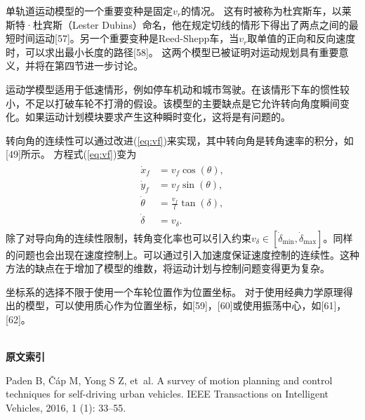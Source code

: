 单轨道运动模型的一个重要变种是固定$v_r$的情况。 这有时被称为杜宾斯车，以莱斯特·杜宾斯（Lester Dubins）命名，他在规定切线的情形下得出了两点之间的最短时间运动[57]。另一个重要变种是Reed-Shepp车，当$v_r$取单值的正向和反向速度时，可以求出最小长度的路径[58]。 这两个模型已被证明对运动规划具有重要意义，并将在第四节进一步讨论。

运动学模型适用于低速情形，例如停车机动和城市驾驶。在该情形下车的惯性较小，不足以打破车轮不打滑的假设。该模型的主要缺点是它允许转向角度瞬间变化。如果运动计划模块要求产生这种瞬时变化，这将是有问题的。

转向角的连续性可以通过改进(\ref{eq:vf})来实现，其中转向角是转角速率的积分，如[49]所示。 方程式(\ref{eq:vf})变为
\begin{align}
\begin{split}
\dot{x}_f&= v_f\cos(\theta),\\
\dot{y}_f&= v_f\sin(\theta),\\
\dot{\theta}&=\frac{v_f}{l}\tan(\delta),\\
\dot{\delta}&=v_{\delta}.
\end{split}
\end{align}
除了对导向角的连续性限制，转角变化率也可以引入约束$v_{\delta}\in [\dot{\delta}_{\min},\dot{\delta}_{\max}]$。同样的问题也会出现在速度控制上。可以通过引入加速度保证速度控制的连续性。这种方法的缺点在于增加了模型的维数，将运动计划与控制问题变得更为复杂。

坐标系的选择不限于使用一个车轮位置作为位置坐标。 对于使用经典力学原理得出的模型，可以使用质心作为位置坐标，如[59]，[60]或使用振荡中心，如[61]，[62]。\\\\
\begin{center}
\textbf{原文索引}
\end{center}

\begin{translationbib}
\item Paden B, {\v{C}}{\'a}p M, Yong S Z, et~al.
\newblock A survey of motion planning and control techniques for self-driving
  urban vehicles\allowbreak[J].
\newblock IEEE Transactions on Intelligent Vehicles, 2016, 1 (1):
  33--55.
\end{translationbib}